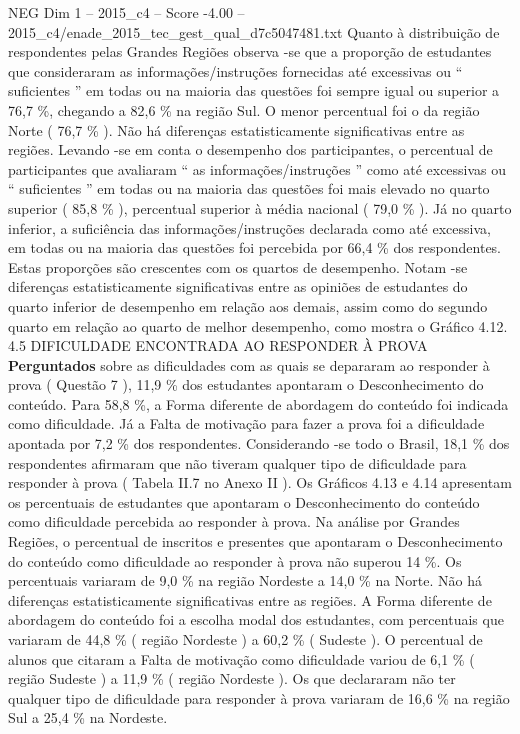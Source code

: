 \begin{textsample}{NEG Dim 1 – 2015\_c4 – Score -4.00 – 2015\_c4/enade\_2015\_tec\_gest\_qual\_d7c5047481.txt}
Quanto à distribuição de respondentes pelas Grandes Regiões observa -se que a proporção de estudantes que consideraram as informações/instruções fornecidas até excessivas ou “ suficientes ” em todas ou na maioria das questões foi sempre igual ou superior a 76,7 \%, chegando a 82,6 \% na região Sul.
O menor percentual foi o da região Norte ( 76,7 \% ).
Não há diferenças estatisticamente significativas entre as regiões.
Levando -se em conta o desempenho dos participantes, o percentual de participantes que avaliaram “ as informações/instruções ” como até excessivas ou “ suficientes ” em todas ou na maioria das questões foi mais elevado no quarto superior ( 85,8 \% ), percentual superior à média nacional ( 79,0 \% ).
Já no quarto inferior, a suficiência das informações/instruções declarada como até excessiva, em todas ou na maioria das questões foi percebida por 66,4 \% dos respondentes.
Estas proporções são crescentes com os quartos de desempenho.
Notam -se diferenças estatisticamente significativas entre as opiniões de estudantes do quarto inferior de desempenho em relação aos demais, assim como do segundo quarto em relação ao quarto de melhor desempenho, como mostra o Gráfico 4.12. 4.5 DIFICULDADE ENCONTRADA AO RESPONDER À PROVA \textbf{Perguntados} sobre as dificuldades com as quais se depararam ao responder à prova ( Questão 7 ), 11,9 \% dos estudantes apontaram o Desconhecimento do conteúdo.
Para 58,8 \%, a Forma diferente de abordagem do conteúdo foi indicada como dificuldade.
Já a Falta de motivação para fazer a prova foi a dificuldade apontada por 7,2 \% dos respondentes.
Considerando -se todo o Brasil, 18,1 \% dos respondentes afirmaram que não tiveram qualquer tipo de dificuldade para responder à prova ( Tabela II.7 no Anexo II ).
Os Gráficos 4.13 e 4.14 apresentam os percentuais de estudantes que apontaram o Desconhecimento do conteúdo como dificuldade percebida ao responder à prova.
Na análise por Grandes Regiões, o percentual de inscritos e presentes que apontaram o Desconhecimento do conteúdo como dificuldade ao responder à prova não superou 14 \%.
Os percentuais variaram de 9,0 \% na região Nordeste a 14,0 \% na Norte.
Não há diferenças estatisticamente significativas entre as regiões.
A Forma diferente de abordagem do conteúdo foi a escolha modal dos estudantes, com percentuais que variaram de 44,8 \% ( região Nordeste ) a 60,2 \% ( Sudeste ).
O percentual de alunos que citaram a Falta de motivação como dificuldade variou de 6,1 \% ( região Sudeste ) a 11,9 \% ( região Nordeste ).
Os que declararam não ter qualquer tipo de dificuldade para responder à prova variaram de 16,6 \% na região Sul a 25,4 \% na Nordeste.

\end{textsample}
